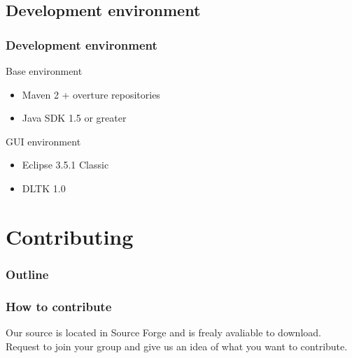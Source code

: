 \subsection{Development environment}
\frame
{
  \frametitle{Development environment}


\begin{block}{Base environment}
  \begin{itemize}
  		\item Maven 2 + overture repositories
  		\item Java SDK 1.5 or greater
  \end{itemize}
\end{block}

\begin{block}{GUI environment}
  \begin{itemize}
  		\item Eclipse 3.5.1 Classic
  		\item DLTK 1.0
  \end{itemize}
\end{block}
}

\section{Contributing}
%
%
\begin{frame}
  \frametitle{Outline}
  \tableofcontents[current]
\end{frame}


\frame
{
  \frametitle{How to contribute}


Our source is located in Source Forge and is frealy avaliable to download.
Request to join your group and give us an idea of what you want to contribute.
}

